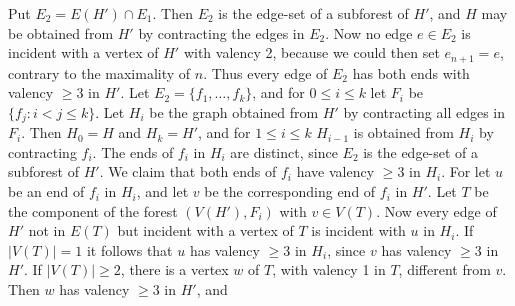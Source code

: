 Put $E_2 = E(H') \cap E_1$. Then $E_2$ is the edge-set of a subforest of $H'$, and $H$ may be obtained from $H'$ by contracting the edges in $E_2$. Now no edge $e \in E_2$ is incident with a vertex of $H'$ with valency 2, because we could then set $e_{n+1} = e$, contrary to the maximality of $n$. Thus every edge of $E_2$ has both ends with valency $\ge 3$ in $H'$. Let $E_2 = \{f_1, \dots, f_k\}$, and for $0 \le i \le k$ let $F_i$ be $\{f_j \colon i < j \le k\}$. Let $H_i$ be the graph obtained from $H'$ by contracting all edges in $F_i$. Then $H_0 = H$ and $H_k = H'$, and for $1 \le i \le k$ $H_{i-1}$ is obtained from $H_i$ by contracting $f_i$. The ends of $f_i$ in $H_i$ are distinct, since $E_2$ is the edge-set of a subforest of $H'$. We claim that both ends of $f_i$ have valency $\ge 3$ in $H_i$. For let $u$ be an end of $f_i$ in $H_i$, and let $v$ be the corresponding end of $f_i$ in $H'$. Let $T$ be the component of the forest $(V(H'), F_i)$ with $v \in V(T)$. Now every edge of $H'$ not in $E(T)$ but incident with a vertex of $T$ is incident with $u$ in $H_i$. If $|V(T)| = 1$ it follows that $u$ has valency $\ge 3$ in $H_i$, since $v$ has valency $\ge 3$ in $H'$. If $|V(T)| \ge 2$, there is a vertex $w$ of $T$, with valency 1 in $T$, different from $v$. Then $w$ has valency $\ge 3$ in $H'$, and
